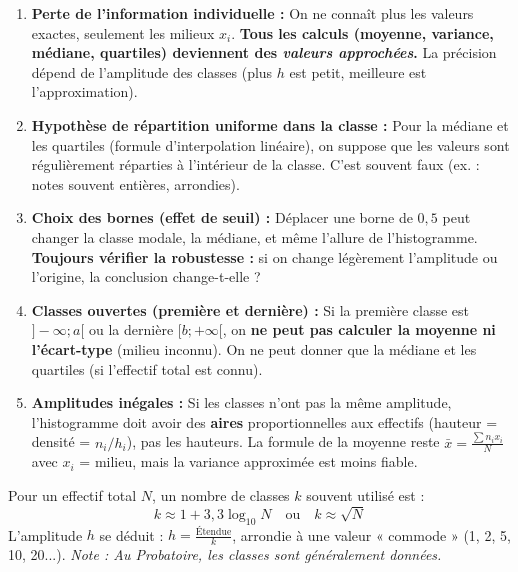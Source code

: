 \documentclass[11pt]{article}
\begin{document}
\begin{attention}
\begin{enumerate}
    \item \textbf{Perte de l'information individuelle :} On ne connaît plus les valeurs exactes, seulement les milieux $x_i$. \textbf{Tous les calculs (moyenne, variance, médiane, quartiles) deviennent des \emph{valeurs approchées}.} La précision dépend de l'amplitude des classes (plus $h$ est petit, meilleure est l'approximation).
    \item \textbf{Hypothèse de répartition uniforme dans la classe :} Pour la médiane et les quartiles (formule d'interpolation linéaire), on suppose que les valeurs sont régulièrement réparties à l'intérieur de la classe. C'est souvent faux (ex. : notes souvent entières, arrondies).
    \item \textbf{Choix des bornes (effet de seuil) :} Déplacer une borne de $0,5$ peut changer la classe modale, la médiane, et même l'allure de l'histogramme. \textbf{Toujours vérifier la robustesse :} si on change légèrement l'amplitude ou l'origine, la conclusion change-t-elle ?
    \item \textbf{Classes ouvertes (première et dernière) :} Si la première classe est $]-\infty; a[$ ou la dernière $[b; +\infty[$, on \textbf{ne peut pas calculer la moyenne ni l'écart-type} (milieu inconnu). On ne peut donner que la médiane et les quartiles (si l'effectif total est connu).
    \item \textbf{Amplitudes inégales :} Si les classes n'ont pas la même amplitude, l'histogramme doit avoir des \textbf{aires} proportionnelles aux effectifs (hauteur = densité = $n_i / h_i$), pas les hauteurs. La formule de la moyenne reste $\bar{x} = \frac{\sum n_i x_i}{N}$ avec $x_i$ = milieu, mais la variance approximée est moins fiable.
\end{enumerate}
\end{attention}

\begin{propriete}
Pour un effectif total $N$, un nombre de classes $k$ souvent utilisé est :
\[ k \approx 1 + 3,3 \log_{10} N \quad \text{ou} \quad k \approx \sqrt{N} \]
L'amplitude $h$ se déduit : $h = \frac{\text{Étendue}}{k}$, arrondie à une valeur « commode » (1, 2, 5, 10, 20...).
\textit{Note : Au Probatoire, les classes sont généralement données.}
\end{propriete}
\end{document}
